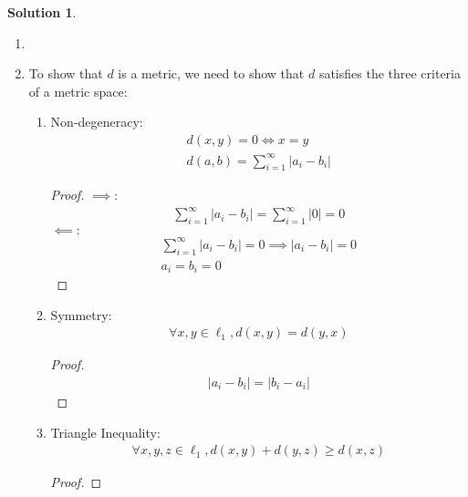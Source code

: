 \documentclass[12pt]{article}
\theoremstyle{definition} %
\newtheorem{solution}{Solution}
\theoremstyle{plain} %
\begin{document}
\begin{solution}
        \begin{enumerate}
            \item \item To show that \(d\) is a metric, we need to show that \(d\) satisfies the three criteria of a metric space:
            \begin{enumerate}
                \item Non-degeneracy:
                \begin{align}
                  d(x,y)=0 \iff x=y \\[10pt] 
                  d(a,b) = \sum_{i=1}^{\infty} \left\vert a_i - b_{i} \right\vert  
                \end{align} 
                \begin{proof}
                    \(\implies:\) 
                    \begin{align}
                        \sum_{i=1}^{\infty} \left\vert a_{i}-b_{i} \right\vert = \sum_{i=1}^{\infty} \left\vert 0 \right\vert =0 
                    \end{align} 
                    \(\impliedby:\) 
                    \begin{align}
                        \sum_{i=1}^{\infty} \left\vert a_{i}-b_{i} \right\vert =0 \implies \left\vert a_{i}-b_{i} \right\vert =0 \\[10pt] 
                        a_{i}=b_{i}=0
                    \end{align}
                \end{proof}
                \item Symmetry:
                \begin{align}
                    \forall x,y \in \ell_1, d(x,y)=d(y,x) 
                \end{align}
                \begin{proof}
                    \begin{align}
                        \left\vert a_{i}-b_{i} \right\vert =\left\vert b_{i}-a_{i} \right\vert 
                    \end{align}
                \end{proof}
                \item Triangle Inequality: 
                \begin{align}
                    \forall x,y,z \in \ell_1, d(x,y)+d(y,z)\geq d(x,z)
                \end{align} 
                    \begin{proof}

\end{proof}
\end{enumerate}
\end{enumerate}
\end{solution}
\end{document}
